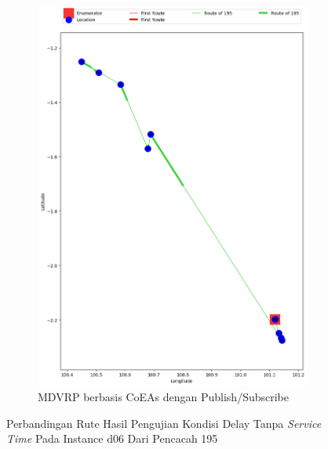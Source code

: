 \begin{figure}[H]\ContinuedFloat
	\centering
	\begin{subfigure}[t]{\textwidth}
		\centering
		\includegraphics[width=\textwidth]{Resources/Images/delayed_6/real_m15_n100_delayed_6_195_pubsub_coes}
		\caption{MDVRP berbasis CoEAs dengan Publish/Subscribe}
		\label{fig:real_m15_n100_delayed_6_195_pubsub_coes}
	\end{subfigure}
	\caption{Perbandingan Rute Hasil Pengujian Kondisi Delay Tanpa \textit{Service Time} Pada Instance d06 Dari Pencacah 195}
	\label{fig:real_m15_n100_delayed_6_195_contd}
\end{figure}


